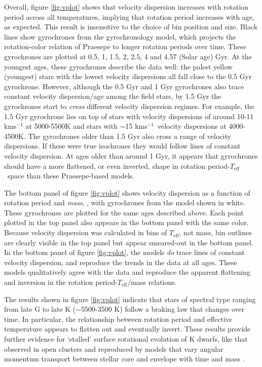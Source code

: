 \documentclass{aastex63}
\newcommand{\teff}{$T_{\mathrm{eff}}$}
\newcommand{\kms}{kms$^{-1}$}
\newcommand{\racomment}[1]{{\color{black}#1}}
\begin{document}
Overall, figure \ref{fig:vplot} shows that velocity dispersion increases with
rotation period across all temperatures, implying that rotation period
increases with age, as expected.
This result is insensitive to the choice of bin position and size.
Black lines show gyrochrones from the \citet{angus2019} gyrochronology model,
which projects the rotation-color relation of Praesepe to longer rotation
periods over time.
These gyrochrones are plotted at 0.5, 1, 1.5, 2, 2.5, 4 and 4.57 (Solar age)
Gyr.
At the youngest ages, these gyrochrones describe the data well: the palest
yellow (youngest) stars with the lowest velocity dispersions all fall close to
the 0.5 Gyr gyrochrone.
However, although the 0.5 Gyr and 1 Gyr gyrochrones also trace constant
velocity dispersion/age among the field stars, by 1.5 Gyr the gyrochrones
start to {\it cross} different velocity dispersion regimes.
For example, the 1.5 Gyr gyrochrone lies on top of stars with velocity
dispersions of around 10-11 kms$^{-1}$ at 5000-5500K and stars with $\sim$15
\kms\ velocity dispersions at 4000-4500K.
The gyrochrones older than 1.5 Gyr also cross a range of velocity dispersions.
If these were true isochrones they would follow lines of constant velocity
dispersion.
At ages older than around 1 Gyr, it appears that gyrochrones should have a
more flattened, or even inverted, shape in rotation period-\teff\ space than
these Praesepe-based models.

The bottom panel of figure \ref{fig:vplot} shows velocity dispersion as a
function of rotation period and {\it mass}, \citep[from][]{berger2020}, with
gyrochrones from the \citet{spada2019} model shown in white.
These gyrochrones are \racomment{plotted for the same ages described above.}
Each point plotted in the top panel also appears in the bottom panel with the
same color.
Because velocity dispersion was calculated in bins of \teff, not mass, bin
outlines are clearly visible in the top panel but appear smeared-out in the
bottom panel.
In the bottom panel of figure \ref{fig:vplot}, the \citet{spada2019} models
{\it do} trace lines of constant velocity dispersion, and reproduce the trends
in the data at all ages.
These models qualitatively agree with the data and reproduce the apparent
flattening and inversion in the rotation period-\teff/mass relations.

The results shown in figure \ref{fig:vplot} indicate that stars of spectral
type ranging from late G to late K ($\sim$5500-3500 K) follow a braking law
that changes over time.
In particular, the relationship between rotation period and effective
temperature appears to flatten out and eventually invert.
These results provide further evidence for `stalled' surface rotational
evolution of K dwarfs, like that observed in open clusters \citep{curtis2019}
and reproduced by models that vary angular momentum transport between stellar
core and envelope with time and mass \citep{spada2019}.
\end{document}
